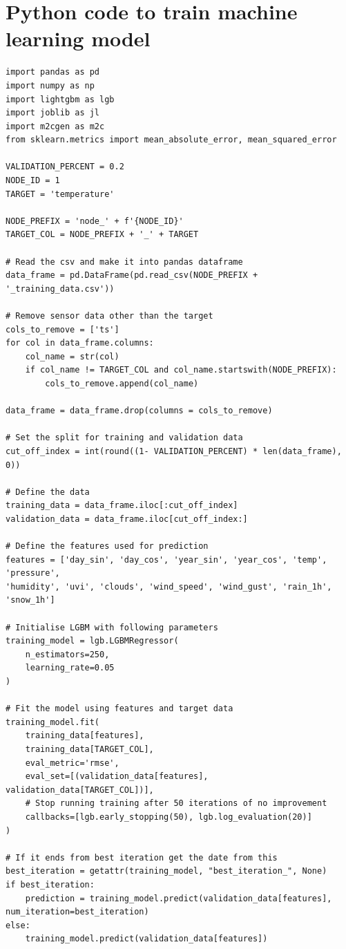 \section{Python code to train machine learning model}\label{app:ml-code}
\begin{multicols}{2}
\begin{lstlisting}
import pandas as pd
import numpy as np
import lightgbm as lgb
import joblib as jl
import m2cgen as m2c
from sklearn.metrics import mean_absolute_error, mean_squared_error

VALIDATION_PERCENT = 0.2
NODE_ID = 1
TARGET = 'temperature'

NODE_PREFIX = 'node_' + f'{NODE_ID}'
TARGET_COL = NODE_PREFIX + '_' + TARGET

# Read the csv and make it into pandas dataframe
data_frame = pd.DataFrame(pd.read_csv(NODE_PREFIX + '_training_data.csv'))

# Remove sensor data other than the target
cols_to_remove = ['ts']
for col in data_frame.columns:
    col_name = str(col)
    if col_name != TARGET_COL and col_name.startswith(NODE_PREFIX):
        cols_to_remove.append(col_name)

data_frame = data_frame.drop(columns = cols_to_remove)

# Set the split for training and validation data
cut_off_index = int(round((1- VALIDATION_PERCENT) * len(data_frame), 0))

# Define the data 
training_data = data_frame.iloc[:cut_off_index]
validation_data = data_frame.iloc[cut_off_index:]

# Define the features used for prediction
features = ['day_sin', 'day_cos', 'year_sin', 'year_cos', 'temp', 'pressure', 
'humidity', 'uvi', 'clouds', 'wind_speed', 'wind_gust', 'rain_1h', 'snow_1h']

# Initialise LGBM with following parameters
training_model = lgb.LGBMRegressor(
    n_estimators=250, 
    learning_rate=0.05
)

# Fit the model using features and target data 
training_model.fit(
    training_data[features],
    training_data[TARGET_COL],
    eval_metric='rmse',
    eval_set=[(validation_data[features], validation_data[TARGET_COL])],
    # Stop running training after 50 iterations of no improvement
    callbacks=[lgb.early_stopping(50), lgb.log_evaluation(20)]
)

# If it ends from best iteration get the date from this
best_iteration = getattr(training_model, "best_iteration_", None)
if best_iteration:
    prediction = training_model.predict(validation_data[features], num_iteration=best_iteration) 
else:
    training_model.predict(validation_data[features])


\end{lstlisting}
\end{multicols}
